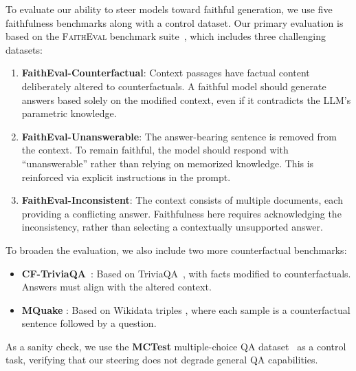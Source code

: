 \documentclass{article} %
\begin{document}
To evaluate our ability to steer models toward faithful generation, we use five faithfulness benchmarks along with a control dataset.
Our primary evaluation is based on the \textsc{FaithEval} benchmark suite~\citep{FaithEval2025}, which includes three challenging datasets:
\begin{enumerate}
    \item \textbf{FaithEval-Counterfactual}: Context passages have factual content deliberately altered to counterfactuals. A faithful model should generate answers based solely on the modified context, even if it contradicts the LLM's parametric knowledge.
    \item \textbf{FaithEval-Unanswerable}: The answer-bearing sentence is removed from the context. To remain faithful, the model should respond with ``unanswerable'' rather than relying on memorized knowledge. This is reinforced via explicit instructions in the prompt.
    \item \textbf{FaithEval-Inconsistent}: The context consists of multiple documents, each providing a conflicting answer. Faithfulness here requires acknowledging the inconsistency, rather than selecting a contextually unsupported answer.
\end{enumerate}



To broaden the evaluation, we also include two more counterfactual benchmarks:
\begin{itemize}
    \item \textbf{CF-TriviaQA}~\citep{köksal2023hallucinationaugmentedrecitationslanguage}: Based on TriviaQA~\citep{joshi-etal-2017-triviaqa}, with facts modified to counterfactuals. Answers must align with the altered context.
    \item \textbf{MQuake} \citep{zhong-etal-2023-mquake}: Based on Wikidata triples \citep{wikidata}, where each sample is a counterfactual sentence followed by a question.
\end{itemize}

As a sanity check, we use the \textbf{MCTest} multiple-choice QA dataset~\citep{richardson-etal-2013-mctest} as a control task, verifying that our steering does not degrade general QA capabilities.
\end{document}
